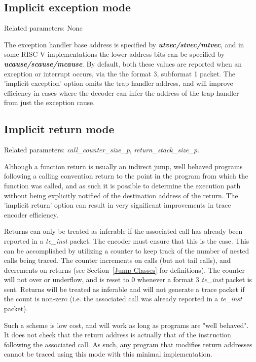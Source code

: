 \subsection{Implicit exception mode} \label{sec:implicit-exception}

Related parameters: None

The exception handler base address is specified by \textbf{\textit{utvec/stvec/mtvec}}, and 
in some RISC-V implementations the lower address bits can be specified by 
\textbf{\textit{ucause/scause/mcause}}.  
By default, both these values are reported when an exception or interrupt occurs, 
via the the format 3, subformat 1 packet.  The 'implicit exception' option omits the 
trap handler address, and will improve efficiency in cases where the decoder can infer 
the address of the trap handler from just the exception cause.

\subsection{Implicit return mode} \label{sec:implicit-return}

Related parameters: \textit{call\_counter\_size\_p}, \textit{return\_stack\_size\_p}.

Although a function return is usually an indirect jump, well behaved programs following a 
calling convention return to the point in the program from which the function was called, 
and as such it is possible to determine the execution path without being explicitly notified 
of the destination address of the return.  The 'implicit return' option can result in very 
significant improvements in trace encoder efficiency.  

Returns can only be treated as inferable if the associated call has already been reported in 
a \textit{te\_inst} packet.  The encoder must ensure that this is the case.  This can be accomplished 
by utilizing a counter to keep track of the number of nested calls being traced.  The counter 
increments on calls (but not tail calls), and decrements on returns (see Section~\ref{Jump Classes} 
for definitions).  The counter will not over or underflow, and is reset to 0 whenever a format 3 
\textit{te\_inst} packet is sent.  Returns will be treated as inferable and will not generate a trace 
packet if the count is non-zero (i.e. the associated call was already reported in a \textit{te\_inst} packet).

Such a scheme is low cost, and will work as long as programs are "well behaved".  It does not check that the 
return address is actually that of the instruction following the associated call.  As such, any program that
modifies return addresses cannot be traced using this mode with this minimal implementation.

